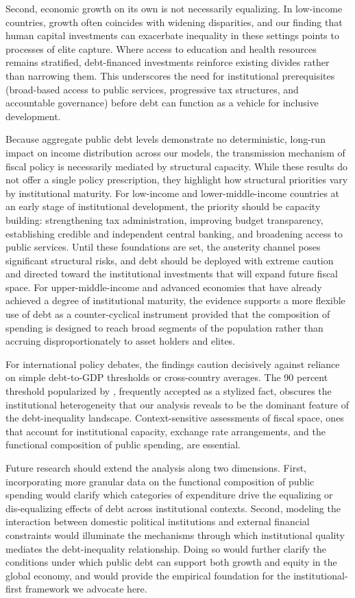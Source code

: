 \documentclass[12pt, titlepage]{article}
\numberwithin{equation}{section}
\begin{document}
	Second, economic growth on its own is not necessarily equalizing. In low-income countries, growth often coincides with widening disparities, and our finding that human capital investments can exacerbate inequality in these settings points to processes of elite capture. Where access to education and health resources remains stratified, debt-financed investments reinforce existing divides rather than narrowing them. This underscores the need for institutional prerequisites (broad-based access to public services, progressive tax structures, and accountable governance) before debt can function as a vehicle for inclusive development.

	Because aggregate public debt levels demonstrate no deterministic, long-run impact on income distribution across our models, the transmission mechanism of fiscal policy is necessarily mediated by structural capacity. While these results do not offer a single policy prescription, they highlight how structural priorities vary by institutional maturity. For low-income and lower-middle-income countries at an early stage of institutional development, the priority should be capacity building: strengthening tax administration, improving budget transparency, establishing credible and independent central banking, and broadening access to public services. Until these foundations are set, the austerity channel poses significant structural risks, and debt should be deployed with extreme caution and directed toward the institutional investments that will expand future fiscal space. For upper-middle-income and advanced economies that have already achieved a degree of institutional maturity, the evidence supports a more flexible use of debt as a counter-cyclical instrument provided that the composition of spending is designed to reach broad segments of the population rather than accruing disproportionately to asset holders and elites.

	For international policy debates, the findings caution decisively against reliance on simple debt-to-GDP thresholds or cross-country averages. The 90 percent threshold popularized by \cite{Reinhart2010}, frequently accepted as a stylized fact, obscures the institutional heterogeneity that our analysis reveals to be the dominant feature of the debt-inequality landscape. Context-sensitive assessments of fiscal space, ones that account for institutional capacity, exchange rate arrangements, and the functional composition of public spending, are essential.

	Future research should extend the analysis along two dimensions. First, incorporating more granular data on the functional composition of public spending would clarify which categories of expenditure drive the equalizing or dis-equalizing effects of debt across institutional contexts. Second, modeling the interaction between domestic political institutions and external financial constraints would illuminate the mechanisms through which institutional quality mediates the debt-inequality relationship. Doing so would further clarify the conditions under which public debt can support both growth and equity in the global economy, and would provide the empirical foundation for the institutional-first framework we advocate here.



	
\end{document}
